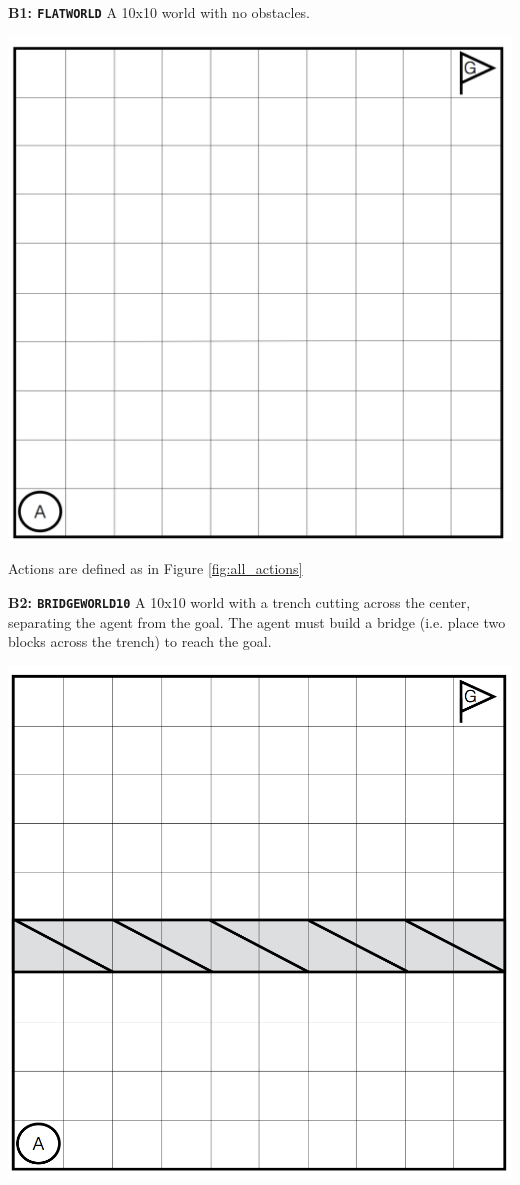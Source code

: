 \documentclass[]{article}
\begin{document}
{\bf B1: \texttt{FLATWORLD}} A 10x10 world with no obstacles.

\begin{center}
\includegraphics[scale=0.24]{figures/flatland.png}
\end{center}

Actions are defined as in Figure \ref{fig:all_actions}
	
{\bf B2: \texttt{BRIDGEWORLD10}} A 10x10 world with a trench cutting across the center, separating the agent from the goal. The agent must build a bridge (i.e. place two blocks across the trench) to reach the goal.

\begin{center}
\includegraphics[scale=0.28]{figures/bridgeworld10.png}
\end{center}
\end{document}
